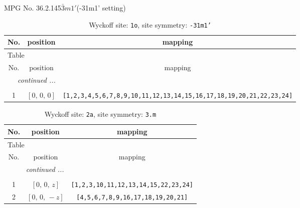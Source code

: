 \documentclass[fleqn,8pt]{jsarticle}
\begin{document}
\setcounter{MaxMatrixCols}{32}

\renewcommand{\tablename}{Table~}
\renewcommand{\figurename}{Figure~}
\begin{center}
\LARGE
MPG No. 36.2.145\quad$\bar{3}m1'$\quad(-31m1' setting)
\end{center}
\renewcommand{\arraystretch}{1.2}
\begin{longtable}{ccc}
\caption{Wyckoff site: {\tt 1o}, site symmetry: {\tt -31m1'}}
 \\
 \hline \hline
No. & position & mapping \\ \hline \endfirsthead

\multicolumn{2}{l}{\tablename\ \thetable{}} \\
 \hline \hline
No. & position & mapping \\ \hline \endhead

 \hline \hline
\multicolumn{2}{r}{\footnotesize\it continued ...} \\ \endfoot

 \hline \hline
\multicolumn{2}{r}{} \\ \endlastfoot

1 & $\left[ 0,\, 0,\, 0 \right]$ & {\tt [1,2,3,4,5,6,7,8,9,10,11,12,13,14,15,16,17,18,19,20,21,22,23,24]} \\
\end{longtable}
\renewcommand{\arraystretch}{1.2}
\begin{longtable}{ccc}
\caption{Wyckoff site: {\tt 2a}, site symmetry: {\tt 3.m}}
 \\
 \hline \hline
No. & position & mapping \\ \hline \endfirsthead

\multicolumn{2}{l}{\tablename\ \thetable{}} \\
 \hline \hline
No. & position & mapping \\ \hline \endhead

 \hline \hline
\multicolumn{2}{r}{\footnotesize\it continued ...} \\ \endfoot

 \hline \hline
\multicolumn{2}{r}{} \\ \endlastfoot

1 & $\left[ 0,\, 0,\, z \right]$ & {\tt [1,2,3,10,11,12,13,14,15,22,23,24]} \\ \hline
2 & $\left[ 0,\, 0,\, - z \right]$ & {\tt [4,5,6,7,8,9,16,17,18,19,20,21]} \\
\end{longtable}
\renewcommand{\arraystretch}{1.2}
\end{document}

